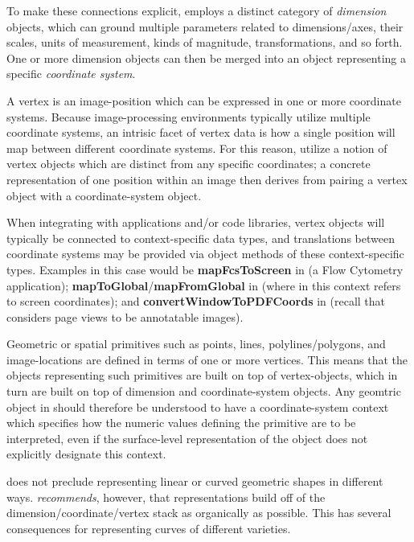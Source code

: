 {\begin{description}
To make these connections explicit, \AXFI{} 
employs a distinct category of \textit{dimension} 
objects, which can ground multiple parameters 
related to dimensions/axes, their scales, units 
of measurement, kinds of magnitude, transformations, 
and so forth.  One or more dimension objects 
can then be merged into an object representing 
a specific \textit{coordinate system}. 

\item[Vertices]  A vertex is an image-position which 
can be expressed in one or more coordinate systems.  
Because image-processing environments typically 
utilize multiple coordinate systems, an 
intrisic facet of vertex data is how 
a single position will map between different 
coordinate systems.  For this reason, \AXFI{} 
utilize a notion of vertex objects which are 
distinct from any specific coordinates; 
a concrete representation of one position 
within an image then derives from 
pairing a vertex object with a coordinate-system 
object.  

When integrating with applications and/or code 
libraries, \AXFI{} vertex objects will typically 
be connected to context-specific data types, 
and translations between coordinate systems 
may be provided via object methods of 
these context-specific types.  Examples 
in this case would be \textbf{mapFcsToScreen} in 
\FACSanadu{} (a Flow Cytometry application);  
\textbf{mapToGlobal}/\textbf{mapFromGlobal} 
in \Qt{} (where  in this context 
refers to screen coordinates); and 
\textbf{convertWindowToPDFCoords} in \XPDF{} 
(recall that \AXFI{} considers \PDF{} page 
views to be annotatable images).

Geometric or spatial primitives such as points, lines, 
polylines/polygons, and image-locations are  
defined in terms of one or more vertices.  
This means that the objects representing such 
primitives are built on top of vertex-objects, 
which in turn are built on top of dimension 
and coordinate-system objects.  Any geomtric 
object in \AXFI{} should therefore be understood 
to have a coordinate-system context which specifies 
how the numeric values defining the primitive 
are to be interpreted, even if the surface-level 
representation of the object does not explicitly 
designate this context. 

\item[Circles, Ellipses, and Curves]  \lAXFI{} 
does not preclude representing linear or curved 
geometric shapes in different ways.  \lAXFI{} 
\textit{recommends}, however, that 
representations build off of the dimension/coordinate/vertex 
stack as organically as possible.  This has several 
consequences for representing curves of different 
varieties.  


\end{description}}

